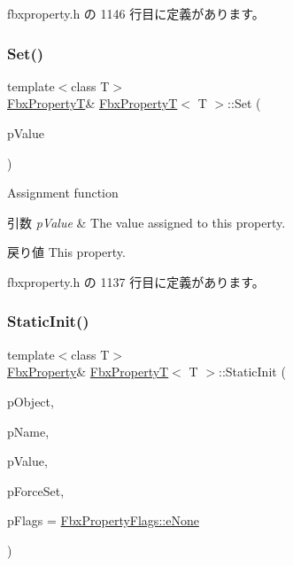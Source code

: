  fbxproperty.\+h の 1146 行目に定義があります。

\mbox{\label{class_fbx_property_t_a7245e9041d26955a5c2f31fc40b63228}} 
\subsubsection{\texorpdfstring{Set()}{Set()}}
{\footnotesize\ttfamily template$<$class T$>$ \\
\hyperlink{class_fbx_property_t}{Fbx\+PropertyT}\& \hyperlink{class_fbx_property_t}{Fbx\+PropertyT}$<$ T $>$\+::Set (\begin{DoxyParamCaption}\item[{const T \&}]{p\+Value }\end{DoxyParamCaption})\hspace{0.3cm}{\ttfamily [inline]}}

Assignment function 
\begin{DoxyParams}{引数}
{\em p\+Value} & The value assigned to this property. \\
\hline
\end{DoxyParams}
\begin{DoxyReturn}{戻り値}
This property. 
\end{DoxyReturn}


 fbxproperty.\+h の 1137 行目に定義があります。

\mbox{\label{class_fbx_property_t_a02493c4d2553aea533bcca9ee6e0c935}} 
\subsubsection{\texorpdfstring{Static\+Init()}{StaticInit()}\hspace{0.1cm}{\footnotesize\ttfamily [1/3]}}
{\footnotesize\ttfamily template$<$class T$>$ \\
\hyperlink{class_fbx_property}{Fbx\+Property}\& \hyperlink{class_fbx_property_t}{Fbx\+PropertyT}$<$ T $>$\+::Static\+Init (\begin{DoxyParamCaption}\item[{\hyperlink{class_fbx_object}{Fbx\+Object} $\ast$}]{p\+Object,  }\item[{const char $\ast$}]{p\+Name,  }\item[{const T \&}]{p\+Value,  }\item[{bool}]{p\+Force\+Set,  }\item[{\hyperlink{class_fbx_property_flags_afabfa7e0949aac8a7dcdf8a141867e99}{Fbx\+Property\+Flags\+::\+E\+Flags}}]{p\+Flags = {\ttfamily \hyperlink{class_fbx_property_flags_afabfa7e0949aac8a7dcdf8a141867e99ac1b9aab93d40af76eb419be426de17b1}{Fbx\+Property\+Flags\+::e\+None}} }\end{DoxyParamCaption})\hspace{0.3cm}{\ttfamily [inline]}}

